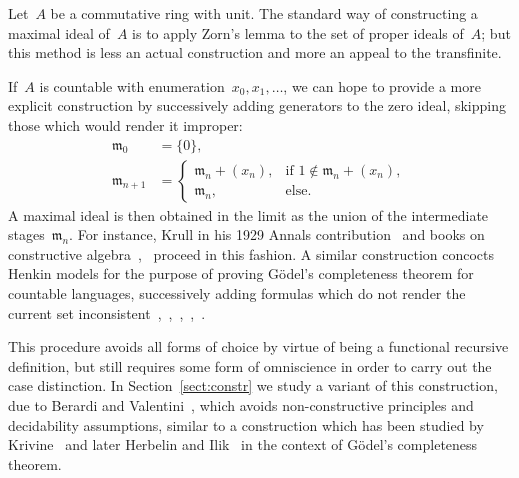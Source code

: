 \documentclass[com,11pt,crcready]{iosart2x}
\theoremstyle{definition}
\theoremstyle{plain}
\theoremstyle{remark}
\newcommand{\mmm}{\mathfrak{m}}
\renewcommand{\_}{\mathpunct{.}\,}
\begin{document}
\begin{frontmatter}
\begin{keyword}
\end{keyword}

\end{frontmatter}

\noindent
Let~$A$ be a commutative ring with unit. The standard way of constructing a
maximal ideal of~$A$ is to apply Zorn's lemma to the set of proper ideals
of~$A$; but this method is less an actual construction and more an appeal to
the transfinite.

If~$A$ is countable with enumeration~$x_0,x_1,\ldots$, we can hope to provide a
more explicit construction by successively adding generators to the zero ideal,
skipping those which would render it improper:
\begin{equation}\label{eq:orig-construction}
  \tag{$\star$}\begin{aligned}
  \mmm_0 &= \{ 0 \}, \\
  \mmm_{n+1} &= \begin{cases}
    \mmm_n + (x_n), & \text{if $1 \not\in \mmm_n + (x_n)$}, \\
    \mmm_n, & \text{else.}
  \end{cases}
\end{aligned}\end{equation}
A maximal ideal is then obtained in the limit as the union of the intermediate
stages~$\mmm_n$. For instance, Krull in his 1929 Annals contribution~\cite[Hilfs\-satz]{krull:ohne} and books on constructive
algebra~\cite[Lemma~VI.3.2]{mines-richman-ruitenburg:constructive-algebra},~\cite[comment after Theorem~VII.5.2]{lombardi-quitte:constructive-algebra} proceed in this fashion.
A similar
construction concocts Henkin models for the purpose of proving
Gödel's completeness theorem for countable languages, successively adding
formulas which do not render the current set
inconsistent~\cite[Satz~I.56]{tarski:fundamental},~\cite[Lemma~1.5.7]{dalen:logic},~\cite[Lemma~III.5.4]{simpson:subsystems},~\cite[Lemma~2.1]{ishihara-khoussainov-nerode:decidable-kripke-models},~\cite[Section~A.4]{coquand-lombardi:hidden-krull}.

This procedure avoids all forms of choice by virtue of being a
functional recursive definition, but still requires some form of omniscience in
order to carry out the case distinction.
In Section~\ref{sect:constr} we study a variant of this construction, due to Berardi and
Valentini~\cite{berardi-valentini:krivine}, which
avoids non-constructive principles and decidability assumptions, similar to
a construction which has been studied by
Krivine~\cite[p.~410]{krivine:completeness} and later Herbelin and
Ilik~\cite[p.~11]{herbelin-ilik:henkin} in the
context of Gödel's completeness theorem.
\end{document}
